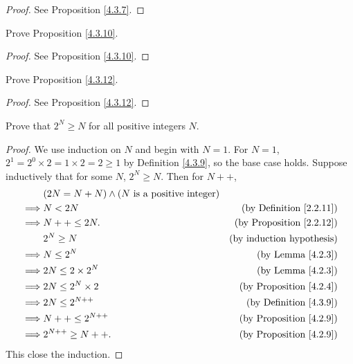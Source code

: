 \begin{proof}
See Proposition \ref{4.3.7}.
\end{proof}

\begin{exercise}\label{ex 4.3.3}
Prove Proposition \ref{4.3.10}.
\end{exercise}

\begin{proof}
See Proposition \ref{4.3.10}.
\end{proof}

\begin{exercise}
Prove Proposition \ref{4.3.12}.
\end{exercise}

\begin{proof}
See Proposition \ref{4.3.12}.
\end{proof}

\begin{exercise}\label{ex 4.3.5}
Prove that \(2^N \geq N\) for all positive integers \(N\).
\end{exercise}

\begin{proof}
We use induction on \(N\) and begin with \(N = 1\).
For \(N = 1\), \(2^1 = 2^0 \times 2 = 1 \times 2 = 2 \geq 1\) by Definition \ref{4.3.9}, so the base case holds.
Suppose inductively that for some \(N\), \(2^N \geq N\).
Then for \(N++\),
\begin{align*}
& (2N = N + N) \land (N \text{ is a positive integer}) \\
\implies & N < 2N & \text{(by Definition \ref{2.2.11})} \\
\implies & N++ \leq 2N. & \text{(by Proposition \ref{2.2.12})} \\
& 2^N \geq N & \text{(by induction hypothesis)} \\
\implies & N \leq 2^N & \text{(by Lemma \ref{4.2.3})} \\
\implies & 2N \leq 2 \times 2^N & \text{(by Lemma \ref{4.2.3})} \\
\implies & 2N \leq 2^N \times 2 & \text{(by Proposition \ref{4.2.4})} \\
\implies & 2N \leq 2^{N++} & \text{(by Definition \ref{4.3.9})} \\
\implies & N++ \leq 2^{N++} & \text{(by Proposition \ref{4.2.9})} \\
\implies & 2^{N++} \geq N++. & \text{(by Proposition \ref{4.2.9})}
\end{align*}
This close the induction.
\end{proof}